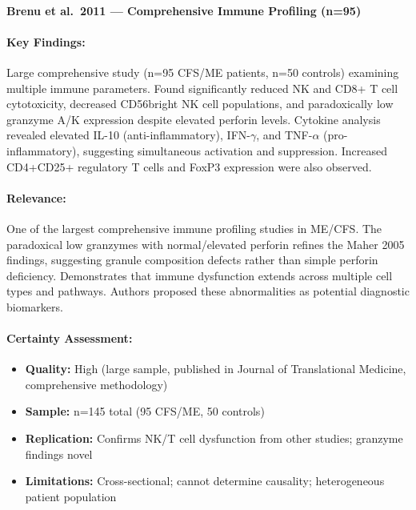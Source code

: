 \paragraph{Brenu et al.\ 2011 --- Comprehensive Immune Profiling (n=95)}

\cite{Brenu2011}

\paragraph{Key Findings:}
Large comprehensive study (n=95 CFS/ME patients, n=50 controls) examining multiple immune parameters. Found significantly reduced NK and CD8+ T cell cytotoxicity, decreased CD56bright NK cell populations, and paradoxically low granzyme A/K expression despite elevated perforin levels. Cytokine analysis revealed elevated IL-10 (anti-inflammatory), IFN-$\gamma$, and TNF-$\alpha$ (pro-inflammatory), suggesting simultaneous activation and suppression. Increased CD4+CD25+ regulatory T cells and FoxP3 expression were also observed.

\paragraph{Relevance:}
One of the largest comprehensive immune profiling studies in ME/CFS. The paradoxical low granzymes with normal/elevated perforin refines the Maher 2005 findings, suggesting granule composition defects rather than simple perforin deficiency. Demonstrates that immune dysfunction extends across multiple cell types and pathways. Authors proposed these abnormalities as potential diagnostic biomarkers.

\paragraph{Certainty Assessment:}
\begin{itemize}
    \item \textbf{Quality:} High (large sample, published in Journal of Translational Medicine, comprehensive methodology)
    \item \textbf{Sample:} n=145 total (95 CFS/ME, 50 controls)
    \item \textbf{Replication:} Confirms NK/T cell dysfunction from other studies; granzyme findings novel
    \item \textbf{Limitations:} Cross-sectional; cannot determine causality; heterogeneous patient population
\end{itemize}

